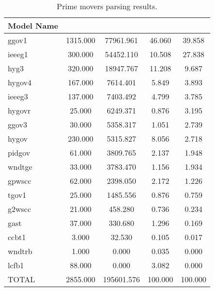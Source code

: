 \begin{table}[!ht]
	\centering
	\begin{tabular}{@{} C{2cm} 
	S[table-format=4.2,round-mode=places, round-precision=2,] 
	S[table-format=6.2,round-mode=places, round-precision=2] 
	S[table-format=3.2,round-mode=places, round-precision=2]
 	S[table-format=3.2,round-mode=places, round-precision=2] @{}} 	
		\toprule %
		\footnotesize %
		\raggedright %
Model Name & 	  & 	  & 			&		\\ \midrule
ggov1 & 	1315.000 & 	77961.961 & 	46.060 & 	39.858 \\
ieeeg1 & 	300.000 & 	54452.110 & 	10.508 & 	27.838 \\
hyg3 & 	320.000 & 	18947.767 & 	11.208 & 	9.687 \\
hygov4 & 	167.000 & 	7614.401 & 	5.849 & 	3.893 \\
ieeeg3 & 	137.000 & 	7403.492 & 	4.799 & 	3.785 \\
hygovr & 	25.000 & 	6249.371 & 	0.876 & 	3.195 \\
ggov3 & 	30.000 & 	5358.317 & 	1.051 & 	2.739 \\
hygov & 	230.000 & 	5315.827 & 	8.056 & 	2.718 \\
pidgov & 	61.000 & 	3809.765 & 	2.137 & 	1.948 \\
wndtge & 	33.000 & 	3783.470 & 	1.156 & 	1.934 \\
gpwscc & 	62.000 & 	2398.050 & 	2.172 & 	1.226 \\
tgov1 & 	25.000 & 	1485.556 & 	0.876 & 	0.759 \\
g2wscc & 	21.000 & 	458.280 & 	0.736 & 	0.234 \\
gast & 	37.000 & 	330.680 & 	1.296 & 	0.169 \\
ccbt1 & 	3.000 & 	32.530 & 	0.105 & 	0.017 \\
wndtrb & 	1.000 & 	0.000 & 	0.035 & 	0.000 \\
lcfb1 & 	88.000 & 	0.000 & 	3.082 & 	0.000 \\ \midrule
TOTAL & 	2855.000 & 	195601.576 & 	100.000 & 	100.000 \\
		\bottomrule
	\end{tabular}
	\caption{Prime movers parsing results.}
	\label{tab: dydParse Prime Movers }
\end{table}